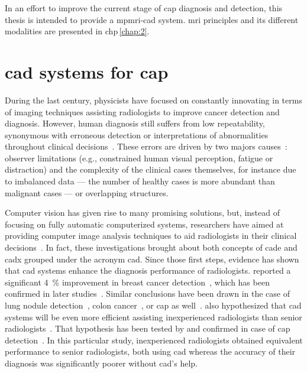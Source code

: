 In an effort to improve the current stage of \ac{cap} diagnosis and detection, this thesis is intended to provide a \ac{mpmri}-\acs{cad} system. 
\ac{mri} principles and its different modalities are presented in \acs{chp}\,\ref{chap:2}. 

\section{\acs*{cad} systems for \acs*{cap}}\label{sec:intro:cad} 
During the last century, physicists have focused on constantly innovating in terms of imaging techniques assisting radiologists to improve cancer detection and diagnosis.
However, human diagnosis still suffers from low repeatability, synonymous with erroneous detection or interpretations of abnormalities throughout clinical decisions~\cite{Giger2008,Hambrock2013}.
These errors are driven by two majors causes~\cite{Giger2008}: observer limitations (e.g., constrained human visual perception, fatigue or distraction) and the complexity of the clinical cases themselves, for instance due to imbalanced data --- the number of healthy cases is more abundant than malignant cases --- or overlapping structures.

Computer vision has given rise to many promising solutions, but, instead of focusing on fully automatic computerized systems, researchers have aimed at providing computer image analysis techniques to aid radiologists in their clinical decisions~\cite{Giger2008}.
In fact, these investigations brought about both concepts of \ac{cade} and \ac{cadx} grouped under the acronym \ac{cad}.
Since those first steps, evidence has shown that \ac{cad} systems enhance the diagnosis performance of radiologists.
\citeauthor{Chan1999} reported a significant \SI{4}{\percent} improvement in breast cancer detection~\cite{Chan1999}, which has been confirmed in later studies~\cite{Dean2006}.
Similar conclusions have been drawn in the case of lung nodule detection~\cite{Li2004}, colon cancer~\cite{Petrick2008}, or \ac{cap} as well~\cite{Hambrock2013}.
\citeauthor{Chan1999} also hypothesized that \acs{cad} systems will be even more efficient assisting inexperienced radiologists than senior radiologists~\cite{Chan1999}.
That hypothesis has been tested by \citeauthor{Hambrock2013} and confirmed in case of \ac{cap} detection~\cite{Hambrock2013}.
In this particular study, inexperienced radiologists obtained equivalent performance to senior radiologists, both using \acs{cad} whereas the accuracy of their diagnosis was significantly poorer without \ac{cad}'s help.


